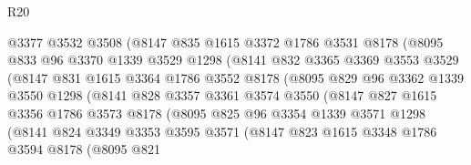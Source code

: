 \begin{lexlean}{R20}
\begin{coremodule}
                    @3377
                    @3532
                    @3508
                    (@8147
                      @835
                      @1615
                      @3372
                      @1786
                      @3531
                      @8178
                      (@8095
                        @833
                        @96
                        @3370
                        @1339
                        @3529
                        @1298
                        (@8141
                          @832
                          @3365
                          @3369
                          @3553
                          @3529
                          (@8147
                            @831
                            @1615
                            @3364
                            @1786
                            @3552
                            @8178
                            (@8095
                              @829
                              @96
                              @3362
                              @1339
                              @3550
                              @1298
                              (@8141
                                @828
                                @3357
                                @3361
                                @3574
                                @3550
                                (@8147
                                  @827
                                  @1615
                                  @3356
                                  @1786
                                  @3573
                                  @8178
                                  (@8095
                                    @825
                                    @96
                                    @3354
                                    @1339
                                    @3571
                                    @1298
                                    (@8141
                                      @824
                                      @3349
                                      @3353
                                      @3595
                                      @3571
                                      (@8147
                                        @823
                                        @1615
                                        @3348
                                        @1786
                                        @3594
                                        @8178
                                        (@8095
                                          @821

\end{coremodule}
\end{lexlean}
